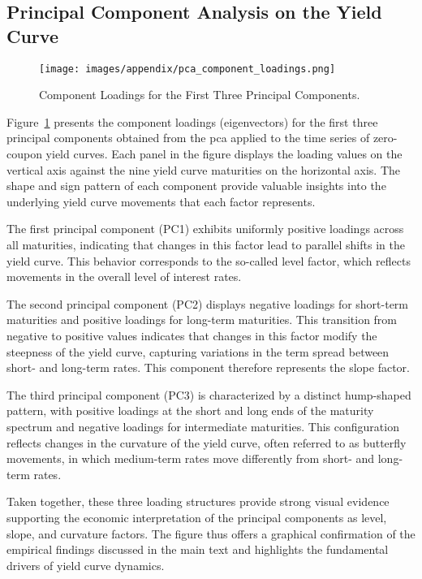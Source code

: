 \subsection{Principal Component Analysis on the Yield Curve}
\begin{figure}[H]
	\centering
	\texttt{[image: images/appendix/pca\_component\_loadings.png]}
	\caption{Component Loadings for the First Three Principal Components.}
	\label{fig:pca_loadings}
\end{figure}

Figure~\ref{fig:pca_loadings} presents the component loadings (eigenvectors) for the first three principal components obtained from the \ac{pca} applied to the time series of zero-coupon yield curves. Each panel in the figure displays the loading values on the vertical axis against the nine yield curve maturities on the horizontal axis. The shape and sign pattern of each component provide valuable insights into the underlying yield curve movements that each factor represents.

The first principal component (PC1) exhibits uniformly positive loadings across all maturities, indicating that changes in this factor lead to parallel shifts in the yield curve. This behavior corresponds to the so-called level factor, which reflects movements in the overall level of interest rates.

The second principal component (PC2) displays negative loadings for short-term maturities and positive loadings for long-term maturities. This transition from negative to positive values indicates that changes in this factor modify the steepness of the yield curve, capturing variations in the term spread between short- and long-term rates. This component therefore represents the slope factor.

The third principal component (PC3) is characterized by a distinct hump-shaped pattern, with positive loadings at the short and long ends of the maturity spectrum and negative loadings for intermediate maturities. This configuration reflects changes in the curvature of the yield curve, often referred to as butterfly movements, in which medium-term rates move differently from short- and long-term rates.

Taken together, these three loading structures provide strong visual evidence supporting the economic interpretation of the principal components as level, slope, and curvature factors. The figure thus offers a graphical confirmation of the empirical findings discussed in the main text and highlights the fundamental drivers of yield curve dynamics.

